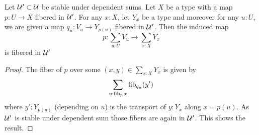 \documentclass{article}
\begin{document}
\begin{lemma}{\label{lemma:AtlasSum}}
	Let $\mathcal{U}' \subset \mathcal{U}$ be stable under dependent sums.
	Let $X$ be a type with a  map $p : U \to X$ fibered in $\mathcal{U}'$.  For any $x : X$, let $Y_x$ be a type and moreover for any $u : U$, we are given a map $q_u : V_u \to Y_{p(u)}$ fibered in $\mathcal{U}'$. Then the induced map
	\[
	p : \sum_{u : U} V_u \to \sum_{x : X} Y_{x}
	\]
	is fibered in $\mathcal{U}'$
\end{lemma}
\begin{proof}
	The fiber of $p$ over some $(x,y) \in \sum_{x :X} Y_x$ is given by
	\[
	\sum_{u : \operatorname{fib}_p x} \operatorname{fib}_{q_u} (y') 
	\]
	where $y' : Y_{p(u)}$ (depending on $u$) is the transport of $y : Y_x$ along $x = p(u)$. As $\mathcal{U}'$ is stable under dependent sum %
	those fibers are again in $\mathcal{U}'$. This shows the result.
\end{proof}















\end{document}
